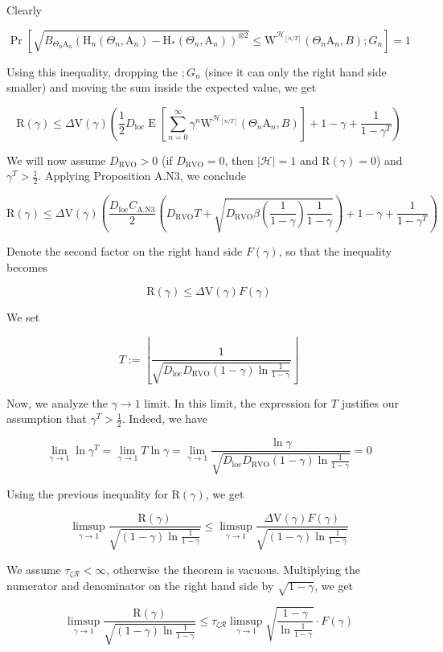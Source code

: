 \documentclass[a4paper]{article}
\newcommand{\AP}[1]{\left(#1\right)}
\newcommand{\AB}[1]{\left[#1\right]}
\newcommand{\Pa}[2]{\underset{#1}{\operatorname{Pr}}\AB{#2}}
\newcommand{\Ea}[2]{\underset{#1}{\operatorname{E}}\AB{#2}}
\newcommand{\Abs}[1]{\left\vert #1 \right\vert}
\newcommand{\Floor}[1]{\left\lfloor #1 \right\rfloor}
\newcommand{\R}{\mathcal{R}}
\newcommand{\Hy}{\mathcal{H}}
\newcommand{\DRVO}{D_{\mathrm{RVO}}}
\newcommand{\DL}{D_{\mathrm{loc}}}
\newcommand{\V}{\mathrm{V}}
\newcommand{\Reg}{\mathrm{R}}
\newcommand{\W}{\mathrm{W}}
\newcommand{\AT}{\mathrm{A}}
\newcommand{\THy}{\mathrm{H}_*}
\newcommand{\SHy}{\mathrm{H}}
\newcommand{\De}{\Delta}
\newcommand{\CSE}{G}
\begin{document}
Clearly

$$\Pa{}{\sqrt{B_{\Theta_n\AT_n}\AP{\SHy_n\AP{\Theta_n,\AT_n}-\THy\AP{\Theta_n,\AT_n}}^{\otimes2}}\leq\W^{\Hy_{\Floor{n/T}}}\AP{\Theta_n\AT_n,B};\CSE_n}=1$$

Using this inequality, dropping the $;G_n$ (since it can only the right hand side smaller) and moving the sum inside the expected value, we get

$$\Reg(\gamma)\leq\Delta\V(\gamma)\AP{\frac{1}{2}\DL\Ea{}{\sum_{n=0}^\infty\gamma^{n}\W^{\Hy_{\Floor{n/T}}}\AP{\Theta_n\AT_n,B} }+1-\gamma+\frac{1}{1-\gamma^T}}$$

We will now assume $\DRVO>0$ (if $\DRVO=0$, then $\Abs{\Hy}=1$ and $\Reg(\gamma)=0$) and $\gamma^T>\frac{1}{2}$. Applying Proposition A.N3, we conclude

$$\Reg(\gamma)\leq\Delta\V(\gamma)\AP{\frac{\DL C_{\mathrm{A.N3}}}{2}\AP{\DRVO T+\sqrt{\DRVO\beta\AP{\frac{1}{1-\gamma}}\frac{1}{1-\gamma}}}+1-\gamma+\frac{1}{1-\gamma^T}}$$

Denote the second factor on the right hand side $F(\gamma)$, so that the inequality becomes 

$$\Reg(\gamma)\leq\De\V(\gamma)F(\gamma)$$

We set

$$T:=\Floor{\frac{1}{\sqrt{\DL\DRVO(1-\gamma)\ln\frac{1}{1-\gamma}}}}$$

Now, we analyze the $\gamma\rightarrow1$ limit. In this limit, the expression for $T$ justifies our assumption that $\gamma^T>\frac{1}{2}$. Indeed, we have

$$\lim_{\gamma\rightarrow1}\ln{\gamma^T}=\lim_{\gamma\rightarrow1}T\ln\gamma=\lim_{\gamma\rightarrow1}\frac{\ln\gamma}{\sqrt{\DL\DRVO(1-\gamma)\ln\frac{1}{1-\gamma}}}=0$$

Using the previous inequality for $\Reg(\gamma)$, we get

$$\limsup_{\gamma\rightarrow1}{\frac{\Reg(\gamma)}{\sqrt{(1-\gamma)\ln{\frac{1}{1-\gamma}}}}}\leq \limsup_{\gamma\rightarrow1}{\frac{\De\V(\gamma)F(\gamma)}{\sqrt{(1-\gamma)\ln{\frac{1}{1-\gamma}}}}}$$

We assume $\tau_{\zeta\R}<\infty$, otherwise the theorem is vacuous. Multiplying the numerator and denominator on the right hand side by $\sqrt{1-\gamma}$, we get

$$\limsup_{\gamma\rightarrow1}{\frac{\Reg(\gamma)}{\sqrt{(1-\gamma)\ln{\frac{1}{1-\gamma}}}}}\leq  \tau_{\zeta\R}\limsup_{\gamma\rightarrow1}{\sqrt{\frac{1-\gamma}{\ln{\frac{1}{1-\gamma}}}}\cdot F(\gamma)}$$
\end{document}
